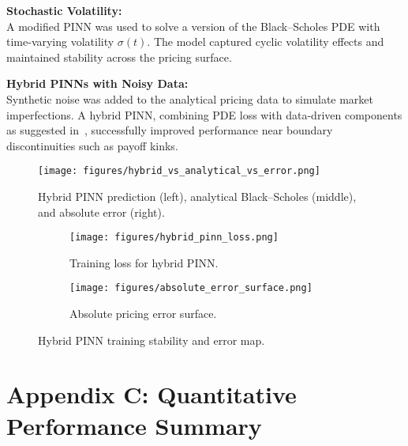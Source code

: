 \documentclass[12pt,a4paper]{article}
\begin{document}
\vspace{1em}

\textbf{Stochastic Volatility:} \\
A modified PINN was used to solve a version of the Black--Scholes PDE with time-varying volatility \( \sigma(t) \). The model captured cyclic volatility effects and maintained stability across the pricing surface.

\textbf{Hybrid PINNs with Noisy Data:} \\
Synthetic noise was added to the analytical pricing data to simulate market imperfections. A hybrid PINN, combining PDE loss with data-driven components as suggested in~\cite{finlay2022train}, successfully improved performance near boundary discontinuities such as payoff kinks.

\begin{figure}[h!]
  \centering
  \texttt{[image: figures/hybrid\_vs\_analytical\_vs\_error.png]}
  \caption{Hybrid PINN prediction (left), analytical Black--Scholes (middle), and absolute error (right).}
  \label{fig:hybrid-surfaces}
\end{figure}

\begin{figure}[h!]
  \centering
  \begin{subfigure}[t]{0.48\textwidth}
    \texttt{[image: figures/hybrid\_pinn\_loss.png]}
    \caption{Training loss for hybrid PINN.}
    \label{fig:hybrid-loss}
  \end{subfigure}
  \hfill
  \begin{subfigure}[t]{0.48\textwidth}
    \texttt{[image: figures/absolute\_error\_surface.png]}
    \caption{Absolute pricing error surface.}
    \label{fig:bs-error}
  \end{subfigure}
  \caption{Hybrid PINN training stability and error map.}
\end{figure}

\clearpage
{}
\section*{Appendix C: Quantitative Performance Summary}
\label{appendix:results}
\end{document}
